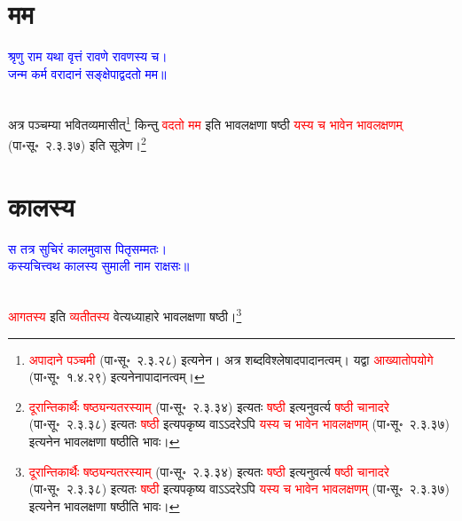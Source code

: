\section[मम]{मम}
\centering\textcolor{blue}{श्रृणु राम यथा वृत्तं रावणे रावणस्य च।\nopagebreak\\
जन्म कर्म वरादानं सङ्क्षेपाद्वदतो मम॥}\nopagebreak\\
\\
\begin{sloppypar}\justifying\noindent\hspace{10mm} अत्र पञ्चम्या भवितव्यमासीत्\footnote{\textcolor{red}{अपादाने पञ्चमी} (पा॰सू॰~२.३.२८) इत्यनेन। अत्र शब्दविश्लेषादपादानत्वम्। यद्वा \textcolor{red}{आख्यातोपयोगे} (पा॰सू॰~१.४.२९) इत्यनेनापादानत्वम्।} किन्तु \textcolor{red}{वदतो मम} इति भाव\-लक्षणा षष्ठी \textcolor{red}{यस्य च भावेन भाव\-लक्षणम्‌} (पा॰सू॰~२.३.३७) इति सूत्रेण।\footnote{\textcolor{red}{दूरान्तिकार्थैः षष्ठ्यन्यतरस्याम्‌} (पा॰सू॰~२.३.३४) इत्यतः \textcolor{red}{षष्ठी} इत्यनुवर्त्य \textcolor{red}{षष्ठी चानादरे} (पा॰सू॰~२.३.३८) इत्यतः \textcolor{red}{षष्ठी} इत्यपकृष्य वाऽऽदरेऽपि \textcolor{red}{यस्य च भावेन भाव\-लक्षणम्‌} (पा॰सू॰~२.३.३७) इत्यनेन भावलक्षणा षष्ठीति भावः।}\end{sloppypar}
\section[कालस्य]{कालस्य}
\centering\textcolor{blue}{स तत्र सुचिरं कालमुवास पितृसम्मतः।\nopagebreak\\
कस्यचित्त्वथ कालस्य सुमाली नाम राक्षसः॥}\nopagebreak\\
\\
\begin{sloppypar}\justifying\noindent\hspace{10mm} \textcolor{red}{आगतस्य} इति \textcolor{red}{व्यतीतस्य} वेत्यध्याहारे भाव\-लक्षणा षष्ठी।\footnote{\textcolor{red}{दूरान्तिकार्थैः षष्ठ्यन्यतरस्याम्‌} (पा॰सू॰~२.३.३४) इत्यतः \textcolor{red}{षष्ठी} इत्यनुवर्त्य \textcolor{red}{षष्ठी चानादरे} (पा॰सू॰~२.३.३८) इत्यतः \textcolor{red}{षष्ठी} इत्यपकृष्य वाऽऽदरेऽपि \textcolor{red}{यस्य च भावेन भाव\-लक्षणम्‌} (पा॰सू॰~२.३.३७) इत्यनेन भावलक्षणा षष्ठीति भावः।}\end{sloppypar}
